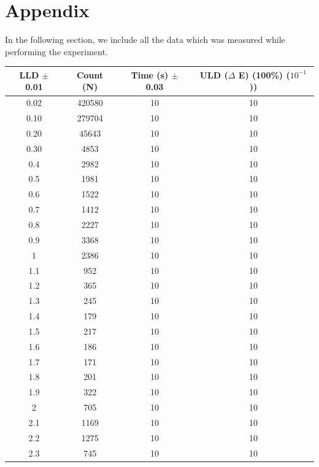 \documentclass[a4paper]{report}
\numberwithin{equation}{section}
\begin{document}
\printbibliography

\chapter{Appendix} \label{sec:Appendix}

In the following section, we include all the data which was measured while performing the experiment.

\begin{table}[!ht]
    \centering
	\begin{tabular}{|c|c|c|c|}
    \hline
	LLD $\pm$ 0.01 & Count (N) & Time (s) $\pm$ 0.03 & ULD ($\Delta$ E) (100\%) ($10^{-1}$)) \\ \hline
        0.02 & 420580 & 10 & 10 \\ \hline
        0.10 & 279704 & 10 & 10 \\ \hline
        0.20 & 45643 & 10 & 10 \\ \hline
        0.30 & 4853 & 10 & 10 \\ \hline
        0.4 & 2982 & 10 & 10 \\ \hline
        0.5 & 1981 & 10 & 10 \\ \hline
        0.6 & 1522 & 10 & 10 \\ \hline
        0.7 & 1412 & 10 & 10 \\ \hline
        0.8 & 2227 & 10 & 10 \\ \hline
        0.9 & 3368 & 10 & 10 \\ \hline
        1 & 2386 & 10 & 10 \\ \hline
        1.1 & 952 & 10 & 10 \\ \hline
        1.2 & 365 & 10 & 10 \\ \hline
        1.3 & 245 & 10 & 10 \\ \hline
        1.4 & 179 & 10 & 10 \\ \hline
        1.5 & 217 & 10 & 10 \\ \hline
        1.6 & 186 & 10 & 10 \\ \hline
        1.7 & 171 & 10 & 10 \\ \hline
        1.8 & 201 & 10 & 10 \\ \hline
        1.9 & 322 & 10 & 10 \\ \hline
        2 & 705 & 10 & 10 \\ \hline
        2.1 & 1169 & 10 & 10 \\ \hline
        2.2 & 1275 & 10 & 10 \\ \hline
        2.3 & 745 & 10 & 10 \\ \hline

\end{tabular}
\end{table}
\end{document}
